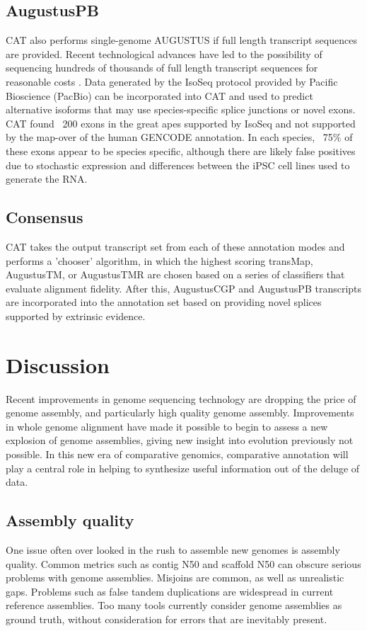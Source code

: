 \documentclass[fleqn,10pt]{wlscirep}
\begin{document}
\subsection{AugustusPB}
CAT also performs single-genome AUGUSTUS if full length transcript sequences are provided. Recent technological advances have led to the possibility of sequencing hundreds of thousands of full length transcript sequences for reasonable costs \cite{korlach2017novo}. Data generated by the IsoSeq protocol provided by Pacific Bioscience (PacBio) \cite{gonzalez2016introduction} can be incorporated into CAT and used to predict alternative isoforms that may use species-specific splice junctions or novel exons. CAT found ~200 exons in the great apes supported by IsoSeq and not supported by the map-over of the human GENCODE annotation. In each species, ~75\% of these exons appear to be species specific, although there are likely false positives due to stochastic expression and differences between the iPSC cell lines used to generate the RNA.

\subsection{Consensus}

CAT takes the output transcript set from each of these annotation modes and performs a 'chooser' algorithm, in which the highest scoring transMap, AugustusTM, or AugustusTMR are chosen based on a series of classifiers that evaluate alignment fidelity. After this, AugustusCGP and AugustusPB transcripts are incorporated into the annotation set based on providing novel splices supported by extrinsic evidence.

\section{Discussion}
Recent improvements in genome sequencing technology are dropping the price of genome assembly, and particularly high quality genome assembly. Improvements in whole genome alignment have made it possible to begin to assess a new explosion of genome assemblies, giving new insight into evolution previously not possible. In this new era of comparative genomics, comparative annotation will play a central role in helping to synthesize useful information out of the deluge of data.

\subsection{Assembly quality}
One issue often over looked in the rush to assemble new genomes is assembly quality. Common metrics such as contig N50 and scaffold N50 can obscure serious problems with genome assemblies. Misjoins are common, as well as unrealistic gaps. Problems such as false tandem duplications are widespread in current reference assemblies. Too many tools currently consider genome assemblies as ground truth, without consideration for errors that are inevitably present.
\end{document}
